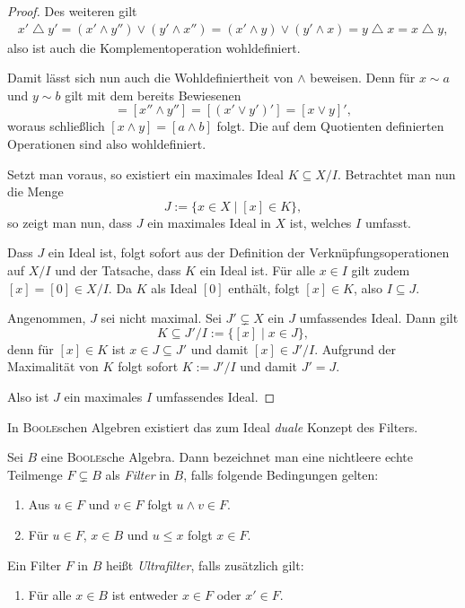 \begin{proof}
  Des weiteren gilt
  \begin{align*}
    x' \bigtriangleup y'
    = (x' \land y'') \lor (y' \land x'')
    = (x' \land y) \lor (y' \land x)
    = y \bigtriangleup x
    = x \bigtriangleup y,
  \end{align*}
  also ist auch die Komplementoperation wohldefiniert.

  Damit lässt sich nun auch die Wohldefiniertheit von $\land$ beweisen.
  Denn für $x \sim a$ und $y \sim b$ gilt mit dem bereits Bewiesenen
  \begin{displaymath}
    [x \land y]
    = [x'' \land y'']
    = [(x' \lor y')']
    = [x \lor y]',
  \end{displaymath}
  woraus schließlich $[x \land y] = [a \land b]$ folgt.
  Die auf dem Quotienten definierten Operationen sind also wohldefiniert.

  Setzt man \PIT voraus, so existiert ein maximales Ideal $K \subseteq X/I$.
  Betrachtet man nun die Menge
  \begin{displaymath}
    J := \{x \in X \mid [x] \in K\},
  \end{displaymath}
  so zeigt man nun, dass $J$ ein maximales Ideal in $X$ ist, welches $I$ umfasst.
  
  Dass $J$ ein Ideal ist, folgt sofort aus der Definition der Verknüpfungsoperationen auf $X/I$ und der Tatsache, dass $K$ ein Ideal ist.
  Für alle $x \in I$ gilt zudem $[x] = [0] \in X/I$. 
  Da $K$ als Ideal $[0]$ enthält, folgt $[x] \in K$, also $I \subseteq J$.
  
  Angenommen, $J$ sei nicht maximal. Sei $J' \subsetneq X$ ein $J$ umfassendes Ideal.
  Dann gilt 
  \begin{displaymath}
    K \subseteq J'/I := \{[x] \mid x \in J\},
  \end{displaymath}
  denn für $[x] \in K$ ist $x \in J \subseteq J'$ und damit $[x] \in J'/I$.
  Aufgrund der Maximalität von $K$ folgt sofort $K := J'/I$ und damit $J' = J$.

  Also ist $J$ ein maximales $I$ umfassendes Ideal.
\end{proof}

In \textsc{Boole}schen Algebren existiert das zum Ideal \textit{duale} Konzept des Filters.

\begin{defn}
  Sei $B$ eine \textsc{Boole}sche Algebra. Dann bezeichnet man eine nichtleere echte Teilmenge $F \subsetneq B$ als \textit{Filter} in $B$, falls folgende Bedingungen gelten:
  \begin{enumerate}[(1)]
    \item Aus $u \in F$ und $v \in F$ folgt $u \land v \in F$.
    \item Für $u \in F$, $x \in B$ und $u \leq x$ folgt  $x \in F$.
  \end{enumerate}
  Ein Filter $F$ in $B$ heißt \textit{Ultrafilter}, falls zusätzlich gilt:
  \begin{enumerate}[(3)]
    \item Für alle $x \in B$ ist entweder $x \in F$ oder $x' \in F$.
  \end{enumerate}
\end{defn}

